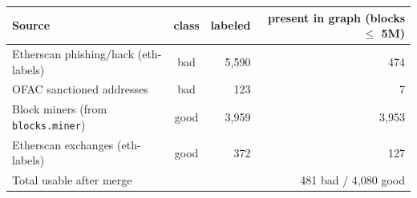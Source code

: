 \begin{tabular}{l c r r}
\toprule
Source & class & labeled & present in graph (blocks $\leq$ 5M)\\
\midrule
Etherscan phishing/hack (eth-labels) & bad & 5,590 & 474\\
OFAC sanctioned addresses & bad & 123 & 7\\
Block miners (from \texttt{blocks.miner}) & good & 3,959 & 3,953\\
Etherscan exchanges (eth-labels) & good & 372 & 127\\
\midrule
Total usable after merge & & & 481 bad / 4,080 good\\
\bottomrule
\end{tabular}